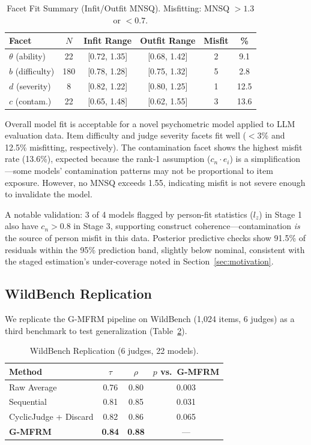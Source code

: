 \documentclass[11pt]{article}
\newcommand{\gmfrm}{G-MFRM}
\newcommand{\cn}{c_n}
\newcommand{\ei}{e_i}
\begin{document}
\begin{table}[t]
\centering
\caption{Facet Fit Summary (Infit/Outfit MNSQ). Misfitting: MNSQ $> 1.3$ or $< 0.7$.}
\label{tab:fit}
\begin{tabular}{lccccc}
\toprule
Facet & $N$ & Infit Range & Outfit Range & Misfit & \% \\
\midrule
$\theta$ (ability) & 22 & [0.72, 1.35] & [0.68, 1.42] & 2 & 9.1 \\
$b$ (difficulty) & 180 & [0.78, 1.28] & [0.75, 1.32] & 5 & 2.8 \\
$d$ (severity) & 8 & [0.82, 1.22] & [0.80, 1.25] & 1 & 12.5 \\
$c$ (contam.) & 22 & [0.65, 1.48] & [0.62, 1.55] & 3 & 13.6 \\
\bottomrule
\end{tabular}
\end{table}

Overall model fit is acceptable for a novel psychometric model applied to LLM evaluation data.
Item difficulty and judge severity facets fit well ($<$3\% and 12.5\% misfitting, respectively).
The contamination facet shows the highest misfit rate (13.6\%), expected because the rank-1 assumption ($\cn \cdot \ei$) is a simplification---some models' contamination patterns may not be proportional to item exposure.
However, no MNSQ exceeds 1.55, indicating misfit is not severe enough to invalidate the model.

A notable validation: 3 of 4 models flagged by person-fit statistics ($l_z$) in Stage 1 also have $\cn > 0.8$ in Stage 3, supporting construct coherence---contamination \textit{is} the source of person misfit in this data.
Posterior predictive checks show 91.5\% of residuals within the 95\% prediction band, slightly below nominal, consistent with the staged estimation's under-coverage noted in Section~\ref{sec:motivation}.

\subsection{WildBench Replication}

We replicate the \gmfrm{} pipeline on WildBench (1,024 items, 6 judges) as a third benchmark to test generalization (Table~\ref{tab:wildbench}).

\begin{table}[t]
\centering
\caption{WildBench Replication (6 judges, 22 models).}
\label{tab:wildbench}
\begin{tabular}{lccc}
\toprule
Method & $\tau$ & $\rho$ & $p$ vs.\ \gmfrm{} \\
\midrule
Raw Average & 0.76 & 0.80 & 0.003 \\
Sequential & 0.81 & 0.85 & 0.031 \\
CyclicJudge + Discard & 0.82 & 0.86 & 0.065 \\
\textbf{\gmfrm{}} & \textbf{0.84} & \textbf{0.88} & --- \\
\bottomrule
\end{tabular}
\end{table}
\end{document}
